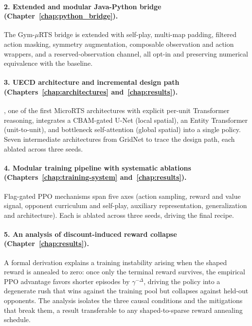\vspace*{-0.04cm}

\paragraph*{2. Extended and modular Java-Python bridge (Chapter~\ref{chap:python_bridge}).} The Gym-$\mu$RTS bridge is extended with self-play, multi-map padding, filtered action masking, symmetry augmentation, composable observation and action wrappers, and a reserved-observation channel, all opt-in and preserving numerical equivalence with the baseline.

\vspace*{-0.04cm}

\paragraph*{3. UECD architecture and incremental design path (Chapters~\ref{chap:architectures} and~\ref{chap:results}).} , one of the first MicroRTS architectures with explicit per-unit Transformer reasoning, integrates a CBAM-gated U-Net (local spatial), an Entity Transformer (unit-to-unit), and bottleneck self-attention (global spatial) into a single policy. Seven intermediate architectures from GridNet to  trace the design path, each ablated across three seeds.

\vspace*{-0.04cm}

\paragraph*{4. Modular training pipeline with systematic ablations (Chapters~\ref{chap:training-system} and~\ref{chap:results}).} Flag-gated PPO mechanisms span five axes (action sampling, reward and value signal, opponent curriculum and self-play, auxiliary representation, generalization and architecture). Each is ablated across three seeds, driving the final recipe.

\vspace*{-0.04cm}

\paragraph*{5. An analysis of discount-induced reward collapse (Chapter~\ref{chap:results}).} A formal derivation explains a training instability arising when the shaped reward is annealed to zero: once only the terminal reward survives, the empirical PPO advantage favors shorter episodes by $\gamma^{-\Delta}$, driving the policy into a degenerate rush that wins against the training pool but collapses against held-out opponents. The analysis isolates the three causal conditions and the mitigations that break them, a result transferable to any shaped-to-sparse reward annealing schedule.

